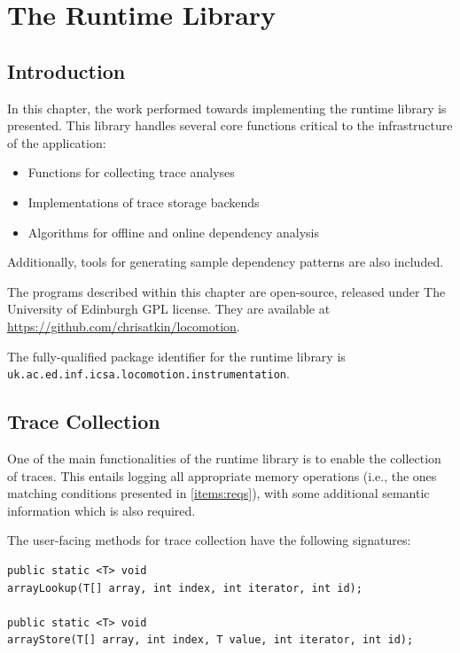 \chapter{The Runtime Library} \label{chp:runtime}
\section{Introduction} \label{sec:runtime/introduction}
In this chapter, the work performed towards implementing the runtime library is presented. This library handles several core functions critical to the infrastructure of the application:

\begin{itemize}
	\item Functions for collecting trace analyses
	\item Implementations of trace storage backends
	\item Algorithms for offline and online dependency analysis
\end{itemize}

Additionally, tools for generating sample dependency patterns are also included.

The programs described within this chapter are open-source, released under The University of Edinburgh GPL license. They are available at \url{https://github.com/chrisatkin/locomotion}.

The fully-qualified package identifier for the runtime library is\\\texttt{uk.ac.ed.inf.icsa.locomotion.instrumentation}.

\section{Trace Collection} \label{sec:runtime/trace-collection}
One of the main functionalities of the runtime library is to enable the collection of traces. This entails logging all appropriate memory operations (i.e., the ones matching conditions presented in \ref{items:reqs}), with some additional semantic information which is also required.

The user-facing methods for trace collection have the following signatures:

\begin{lstlisting}[caption=Method signatures for instrumentation methods,label=lst:sigs]
public static <T> void
arrayLookup(T[] array, int index, int iterator, int id);

public static <T> void
arrayStore(T[] array, int index, T value, int iterator, int id);
\end{lstlisting}

